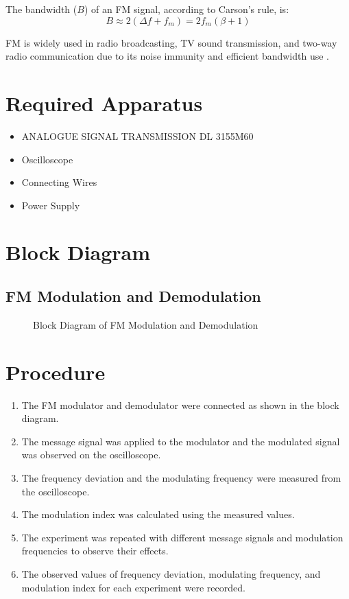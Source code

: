 \documentclass[12pt]{article}
\begin{document}
The bandwidth (\( B \)) of an FM signal, according to Carson's rule, is:
\[
    B \approx 2 (\Delta f + f_m) = 2 f_m (\beta + 1)
\]

FM is widely used in radio broadcasting, TV sound transmission, and two-way radio communication due to its noise immunity and efficient bandwidth use \cite{haykin2008communication, proakis2007digital}.

\section*{Required Apparatus}
\begin{itemize}
    \item ANALOGUE SIGNAL TRANSMISSION DL 3155M60
    \item Oscilloscope
    \item Connecting Wires
    \item Power Supply
\end{itemize}

\section*{Block Diagram}
\subsection*{FM Modulation and Demodulation}
\begin{figure}[H]
    \centering
    \caption{Block Diagram of FM Modulation and Demodulation}
    \label{fig:fm}
\end{figure}

\section*{Procedure}
\begin{enumerate}
    \item The FM modulator and demodulator were connected as shown in the block diagram.
    \item The message signal was applied to the modulator and the modulated signal was observed on the oscilloscope.
    \item The frequency deviation and the modulating frequency were measured from the oscilloscope.
    \item The modulation index was calculated using the measured values.
    \item The experiment was repeated with different message signals and modulation frequencies to observe their effects.
    \item The observed values of frequency deviation, modulating frequency, and modulation index for each experiment were recorded.
\end{enumerate}
\end{document}

